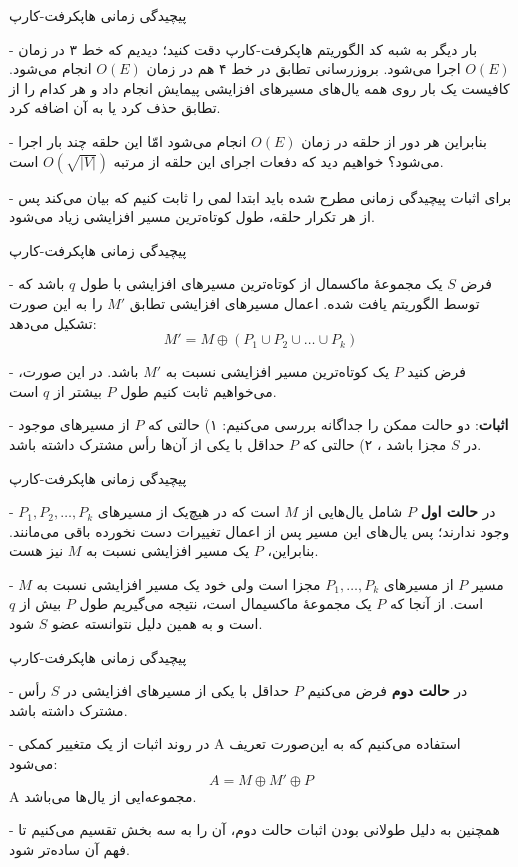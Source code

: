 \begin{itemframe}{‌پیچیدگی زمانی هاپکرفت-کارپ}
\item[-]
بار دیگر به شبه کد الگوریتم هاپکرفت-کارپ دقت کنید؛ دیدیم که خط ۳ در زمان $O(E)$ اجرا می‌شود. بروزرسانی تطابق در خط ۴ هم در  زمان $O(E)$ انجام می‌شود. کافیست یک بار روی همه یال‌های مسیرهای افزایشی پیمایش انجام داد و هر کدام را از تطابق حذف کرد یا به آن اضافه کرد.
\item[-]
بنابراین هر دور از حلقه در زمان $O(E)$ انجام می‌شود امّا این حلقه چند بار اجرا می‌شود؟ خواهیم دید که دفعات اجرای این حلقه از مرتبه
$O(\sqrt{|V|})$
است.
\item[-]
برای اثبات پیچیدگی زمانی مطرح شده باید ابتدا لمی را ثابت کنیم که بیان می‌کند پس از هر تکرار حلقه، طول کوتاه‌ترین مسیر افزایشی زیاد می‌شود.
\end{itemframe}


\begin{itemframe}{‌پیچیدگی زمانی هاپکرفت-کارپ}
\item[-]
فرض $S$ یک مجموعهٔ ماکسمال از کوتاه‌ترین مسیرهای افزایشی با طول $q$ باشد که توسط الگوریتم یافت شده.
اعمال مسیرهای افزایشی تطابق $M'$ را به این صورت تشکیل می‌دهد:
$$
M' = M \oplus (P_1 \cup P_2 \cup \dots \cup P_k)
$$
\item[-]
فرض کنید $P$ یک کوتاه‌ترین مسیر افزایشی نسبت به $M'$ باشد. در این صورت، می‌خواهیم ثابت کنیم طول $P$ بیشتر از $q$ است.
\item[-]
\textbf{اثبات}:
 دو حالت ممکن را جداگانه بررسی می‌کنیم:
 ۱) حالتی که $P$ از مسیرهای موجود در $S$ مجزا باشد ،
 ۲) حالتی که $P$ حداقل با یکی از آن‌ها رأس مشترک داشته باشد.
\end{itemframe}


\begin{itemframe}{‌پیچیدگی زمانی هاپکرفت-کارپ}
\item[-]
در \textbf{حالت اول}  $P$ شامل یال‌هایی از $M$ است که در هیچ‌یک از مسیرهای $P_1, P_2, \dots, P_k$ وجود ندارند؛ پس یال‌های این مسیر پس از اعمال تغییرات دست نخورده باقی می‌مانند. بنابراین، $P$ یک مسیر افزایشی نسبت به $M$ نیز هست.
\item[-]
 مسیر $P$ از مسیرهای $P_1, \dots, P_k$ مجزا است ولی خود یک مسیر افزایشی نسبت به $M$ است. از آنجا که $P$ یک مجموعهٔ ماکسیمال است، نتیجه می‌گیریم طول $P$ بیش از $q$ است و به همین دلیل نتوانسته عضو $S$ شود.
\end{itemframe}


\begin{itemframe}{‌پیچیدگی زمانی هاپکرفت-کارپ}
\item[-]
در \textbf{حالت دوم} فرض می‌کنیم $P$ حداقل با یکی از مسیرهای افزایشی در $S$ رأس مشترک داشته باشد.
\item[-]
در روند اثبات از یک متغییر کمکی A استفاده می‌کنیم که به این‌صورت تعریف می‌شود:
$$
A = M \oplus M' \oplus P
$$
A
 مجموعه‌ایی از یال‌ها می‌باشد.
\item[-]
همچنین به دلیل طولانی بودن اثبات حالت دوم، آن را به سه بخش تقسیم می‌کنیم تا فهم آن ساده‌تر شود.
\end{itemframe}


